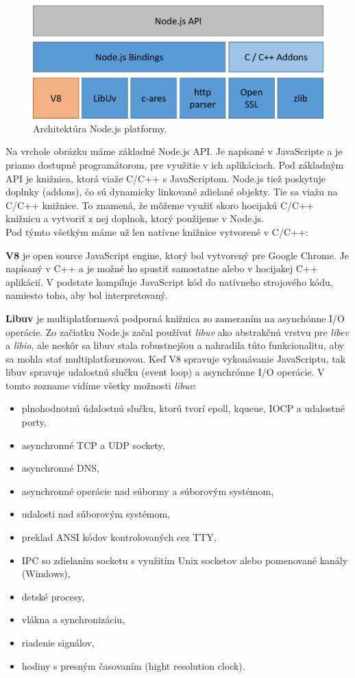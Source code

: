 \begin{figure}[H]
  \centering
  \includegraphics[scale=0.7]{img/node/nodejs-arch.png}
  \caption{Architektúra Node.js platformy.}
  \label{img-node-arch}
\end{figure}

Na vrchole obrázku máme základné Node.js API. Je napísané v JavaScripte a je priamo dostupné programátorom, pre využitie v ich aplikáciach. Pod základným API je knižnica, ktorá viaže C/C++ s JavaScriptom. Node.js tiež poskytuje doplnky (addons), čo sú dynamicky linkované zdielané objekty. Tie sa viažu na C/C++ knižnice. To znamená, že môžeme využiť skoro hocijakú C/C++ knižnicu a vytvoriť z nej doplnok, ktorý použijeme v Node.js.\\
Pod týmto všetkým máme už len natívne knižnice vytvorené v C/C++:

\textbf{V8} je open source JavaScript engine, ktorý bol vytvorený pre Google Chrome. Je napísaný v C++ a je možné ho spustiť samostatne alebo v hocijakej C++ aplikácií. V podstate kompiluje JavaScript kód do natívneho strojového kódu, namiesto toho, aby bol interpretovaný.

\textbf{Libuv} je multiplatformová podporná knižnica zo zameraním na asynchónne I/O operácie. Zo začiatku Node.js začal používať \textit{libuv} ako abstrakčnú vrstvu pre \textit{libev} a \textit{libio}, ale neskôr sa libuv stala robustnejšou a nahradila túto funkcionalitu, aby sa mohla stať multiplatformovou. Keď V8 spravuje vykonávanie JavaScriptu, tak libuv spravuje udalostnú slučku (event loop) a asynchrónne I/O operácie.
V tomto zozname vidíme všetky možnosti \textit{libuv}:
\begin{itemize}
\item plnohodnotnú údalostnú slučku, ktorú tvorí epoll, kqueue, IOCP a udalostné porty,
\item asynchronné TCP a UDP sockety,
\item asynchronné DNS,
\item asynchronné operácie nad súbormy a súborovým systémom,
\item udalosti nad súborovým systémom,
\item preklad ANSI kódov kontrolovaných cez TTY,
\item IPC so zdielaním socketu s využitím Unix socketov alebo pomenované kanály (Windows),
\item detské procesy,
\item vlákna a synchronizáciu,
\item riadenie signálov,
\item hodiny s presným časovaním (hight resolution clock).
\end{itemize}

